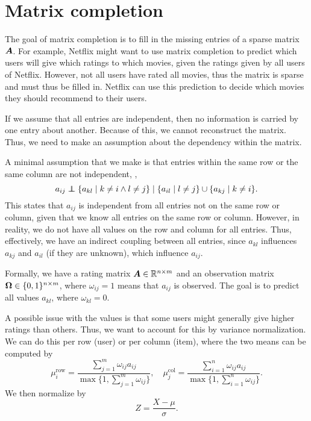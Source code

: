 \section{Matrix completion}

The goal of matrix completion is to fill in the missing entries of a sparse matrix $\bm{A}$. For
example, Netflix might want to use matrix completion to predict which users will give which ratings
to which movies, given the ratings given by all users of Netflix. However, not all users have rated
all movies, thus the matrix is sparse and must thus be filled in. Netflix can use this prediction
to decide which movies they should recommend to their users.

If we assume that all entries are independent, then no information is carried by one entry about
another. Because of this, we cannot reconstruct the matrix. Thus, we need to make an assumption
about the dependency within the matrix.

\begin{important}
    A minimal assumption that we make is that entries
    within the same row or the same column are not independent, \ie, \[
        a_{ij} \mathrel{\perp\!\!\!\!\perp} \{ a_{kl} \mid k \neq i \land l \neq j \} \mid \{ a_{il} \mid l \neq j \} \cup \{ a_{kj} \mid k \neq i \}.
    \]
    This states that $a_{ij}$ is independent from all entries not on the same row or column, given that
    we know all entries on the same row or column. However, in reality, we do not have all values on
    the row and column for all entries. Thus, effectively, we have an indirect coupling between all
    entries, since $a_{kl}$ influences $a_{kj}$ and $a_{il}$ (if they are unknown), which influence
    $a_{ij}$.
\end{important}

Formally, we have a rating matrix $\bm{A} \in \mathbb{R}^{n \times m}$ and an observation matrix
$\bm{\Omega} \in \{ 0,1 \}^{n\times m}$, where $\omega_{ij}=1$ means that $a_{ij}$ is observed.
The goal is to predict all values $a_{kl}$, where $\omega_{kl}=0$.

A possible issue with the values is that some users might generally give higher ratings than
others. Thus, we want to account
for this by variance normalization. We can do this per row (user) or per column (item), where the
two means can be computed by \[
    \mu_i^{\mathrm{row}} = \frac{\sum_{j=1}^{m} \omega_{ij} a_{ij}}{\max \{ 1, \sum_{j=1}^{m} \omega_{ij} \}}, \quad \mu_j^{\mathrm{col}} = \frac{\sum_{i=1}^{n} \omega_{ij} a_{ij}}{\max \{ 1, \sum_{i=1}^{n} \omega_{ij} \}}.
\]
We then normalize by \[
    Z = \frac{X - \mu}{\sigma}.
\]

